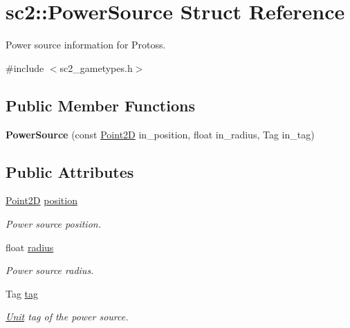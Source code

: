 \hypertarget{structsc2_1_1_power_source}{}\section{sc2\+:\+:Power\+Source Struct Reference}
\label{structsc2_1_1_power_source}


Power source information for Protoss.  




{\ttfamily \#include $<$sc2\+\_\+gametypes.\+h$>$}

\subsection*{Public Member Functions}
\begin{DoxyCompactItemize}
\item 
\mbox{\label{structsc2_1_1_power_source_a7e7f3692959314e185b9505ddb1884b1}} 
{\bfseries Power\+Source} (const \hyperlink{structsc2_1_1_point2_d}{Point2D} in\+\_\+position, float in\+\_\+radius, Tag in\+\_\+tag)
\end{DoxyCompactItemize}
\subsection*{Public Attributes}
\begin{DoxyCompactItemize}
\item 
\mbox{\label{structsc2_1_1_power_source_acbd869abcc7f5964aca0faeb5905ee3d}} 
\hyperlink{structsc2_1_1_point2_d}{Point2D} \hyperlink{structsc2_1_1_power_source_acbd869abcc7f5964aca0faeb5905ee3d}{position}
\begin{DoxyCompactList}\small\item\em Power source position. \end{DoxyCompactList}\item 
\mbox{\label{structsc2_1_1_power_source_ab26f1606de2400d63693272a501d4d2d}} 
float \hyperlink{structsc2_1_1_power_source_ab26f1606de2400d63693272a501d4d2d}{radius}
\begin{DoxyCompactList}\small\item\em Power source radius. \end{DoxyCompactList}\item 
\mbox{\label{structsc2_1_1_power_source_a98e4c9965754bf09d2c9504ed84ccbe9}} 
Tag \hyperlink{structsc2_1_1_power_source_a98e4c9965754bf09d2c9504ed84ccbe9}{tag}
\begin{DoxyCompactList}\small\item\em \hyperlink{classsc2_1_1_unit}{Unit} tag of the power source. \end{DoxyCompactList}\end{DoxyCompactItemize}


